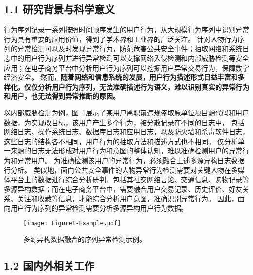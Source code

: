\subsection{\sihao \kaishu \bfseries 1.1 研究背景与科学意义}

行为序列记录一系列按照时间顺序发生的用户行为，从大规模行为序列中识别异常行为具有重要的应用价值，得到了学术界和工业界的广泛关注。
针对人物行为序列的异常检测可以及时发现异常行为，防范危害公共安全事件；抽取网络和系统日志中的用户行为序列并进行异常检测可以支撑网络入侵检测和内部威胁检测等安全应用；在电子商务平台中分析用户行为序列可以挖掘用户异常交易行为，保障数字经济安全。
然而，\textbf{\songti 随着网络和信息系统的发展，用户行为描述形式日益丰富和多样化，仅仅分析用户行为序列，无法准确描述行为语义，难以识别真实的异常行为和用户，也无法得到异常推断的原因。}

以内部威胁检测为例，图~\ref{fig:example}展示了某用户离职前违规盗取原单位项目源代码和用户数据，为实现改目标，该用户产生多个行为，被分散记录在不同的日志中，
包括网络日志、操作系统日志、数据库日志和应用日志，以及防火墙和杀毒软件日志，这些日志的结构各不相同，用户行为的抽取方法和描述方式也不相同。
仅分析单一来源的日志无法形成对用户行为和意图的整体认知，难以准确检测用户的异常行为和异常用户。
为准确检测该用户的异常行为，必须融合上述多源异构日志数据行分析。
类似地，面向公共安全事件的人物异常行为检测需要对关键人物在多媒体平台上的数据进行综合分析研判，包括其社交网络言论、交通信息、购物记录等多源异构数据；而在电子商务平台中，需要融合用户交易记录、历史评价、好友关系、关注和收藏等信息，才能综合分析用户意图，准确识别异常行为。
因此，面向用户行为序列的异常检测需要分析多源异构用户行为数据。

\begin{figure}[htp]
    \centering
    \texttt{[image: Figure1-Example.pdf]}
    \caption{多源异构数据融合的序列异常检测示例。}
    \label{fig:example}
\end{figure}




\subsection{\sihao \songti \bfseries 1.2 国内外相关工作}


